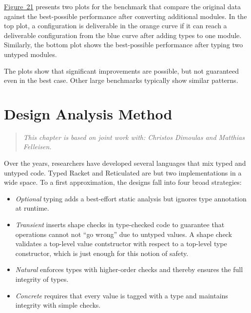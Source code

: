 \documentclass[ twoside,open=right,titlepage,numbers=noenddot,headinclude,%
                footinclude=true,cleardoublepage=empty,abstract=off,
                BCOR=5mm,paper=a4,fontsize=11pt,%
                ngerman,american,%
                parts,pdfspacing]{scrreprt}
\newcommand{\sectionNewpage}{}
\newlength{\stabLeft}
\newcommand{\atItemizeStart}[0]{\addtolength{\stabLeft}{\labelsep}
                                \addtolength{\stabLeft}{\labelwidth}}
\newenvironment{SInsetFlow}{\begin{quote}}{\end{quote}}
\let\SOriginalthesubsection\thesubsection
\newcommand{\Ssection}[2]{\section[#1]{#2}\let\thesubsection\SOriginalthesubsection}
\newcommand{\FigureRef}[2]{#1}
\renewcommand{\Ssection}[2]{\chapter[#1]{#2}}
\begin{document}
\hyperref[t:x28counter_x28x22figurex22_x22figx3aexamplex2dpathx22x29x29]{Figure~\FigureRef{21}{t:x28counter_x28x22figurex22_x22figx3aexamplex2dpathx22x29x29}} presents two plots for the  benchmark
 that compare the original data against the best{-}possible performance after
 converting additional modules.
In the top plot, a configuration is deliverable in the orange curve
 if it can reach a deliverable configuration from the blue curve after
 adding types to one module.
Similarly, the bottom plot shows the best{-}possible performance after typing
 two untyped modules.

The plots show that significant improvements are possible, but not guaranteed
 even in the best case.
Other large benchmarks typically show similar patterns.

\sectionNewpage

\Ssection{Design Analysis Method}{Design Analysis Method}\label{t:x28part_x22secx3adesignx3aintroductionx22x29}

\label{t:x28part_x22chapx3adesignx22x29}

\begin{SInsetFlow}\emph{This chapter is based on joint work with: Christos Dimoulas and Matthias Felleisen.}\end{SInsetFlow}

Over the years, researchers have developed several languages that mix typed and untyped code.
Typed Racket and Reticulated are but two implementations in a wide space.
To a first approximation, the designs fall into four broad strategies:

\begin{itemize}\atItemizeStart

\item \emph{Optional} typing adds a best{-}effort static analysis but
 ignores type annotation at runtime.

\item \emph{Transient} inserts shape checks in type{-}checked code
 to guarantee that operations cannot not {``}go wrong{''} due to
 untyped values.
A shape check validates a top{-}level value contstructor with respect to a
 top{-}level type constructor, which is just enough for this notion of safety.

\item \emph{Natural} enforces types with higher{-}order checks
 and thereby ensures the full integrity of types.

\item \emph{Concrete} requires that every value is tagged with a type and
maintains integrity with simple checks.\end{itemize}
\end{document}
